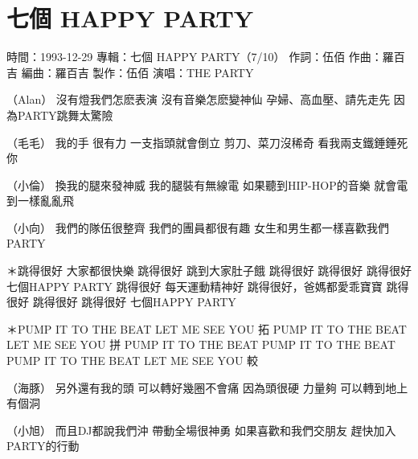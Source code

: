 \documentclass[UTF8,a4paper,oneside,twocolumn,12pt]{ctexbook}
\newcommand{\infopair}[2]{\textbullet #1：#2}
\newcommand{\zc}[1][伍佰]{\infopair{作詞}{#1}}
\newcommand{\zq}[1][伍佰]{\infopair{作曲}{#1}}
\newcommand{\bq}[1][伍佰]{\infopair{編曲}{#1}}
\newcommand{\zj}[1]{\infopair{專輯}{#1}}
\newcommand{\zz}[1]{\infopair{製作}{#1}}
\newcommand{\sj}[1]{\infopair{時間}{#1}}
\newenvironment{info}{\begin{flushleft}\kaishu
	}
	{\end{flushleft}\normalsize\yahei\par}
\newenvironment{lyric}{
	}
{}
\begin{document}
\section{七個 HAPPY PARTY}
\begin{info}
	\sj{1993-12-29}
	\zj{七個 HAPPY PARTY（7/10）}
	\zc
	\zq[羅百吉]
	\bq[羅百吉]
	\zz{伍佰}
	\infopair{演唱}{THE PARTY}
\end{info}
\begin{lyric}
	（Alan）
	沒有燈我們怎麽表演 沒有音樂怎麽變神仙
	孕婦、高血壓、請先走先 因為PARTY跳舞太驚險

	（毛毛）
	我的手 很有力 一支指頭就會倒立
	剪刀、菜刀沒稀奇 看我兩支鐵錘錘死你

	（小倫）
	換我的腿來發神威 我的腿裝有無線電
	如果聽到HIP-HOP的音樂 就會電到一樣亂亂飛

	（小向）
	我們的隊伍很整齊 我們的團員都很有趣
	女生和男生都一樣喜歡我們PARTY

	＊跳得很好 大家都很快樂 跳得很好 跳到大家肚子餓
	跳得很好 跳得很好 跳得很好 七個HAPPY PARTY
	跳得很好 每天運動精神好 跳得很好，爸媽都愛乖寶寶
	跳得很好 跳得很好 跳得很好 七個HAPPY PARTY

	＊PUMP IT TO THE BEAT LET ME SEE YOU 拓
	PUMP IT TO THE BEAT LET ME SEE YOU 拼
	PUMP IT TO THE BEAT PUMP IT TO THE BEAT
	PUMP IT TO THE BEAT LET ME SEE YOU 較

	（海豚）
	另外還有我的頭 可以轉好幾圈不會痛
	因為頭很硬 力量夠 可以轉到地上有個洞

	（小旭）
	而且DJ都說我們沖 帶動全場很神勇
	如果喜歡和我們交朋友 趕快加入PARTY的行動
\end{lyric}
\end{document}
